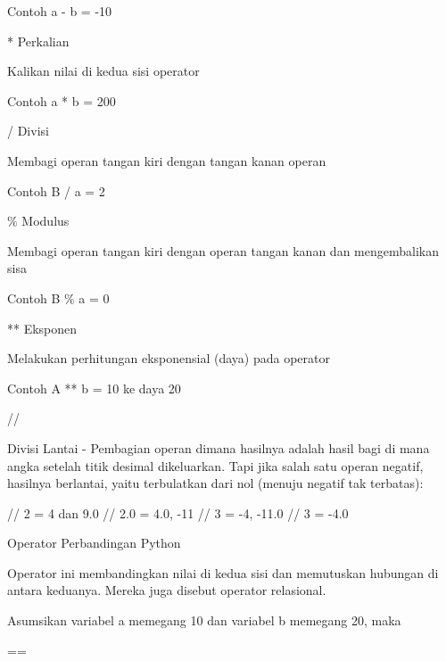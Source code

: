 \noindent 
Contoh a - b = -10 \par
\vspace{12pt}
\noindent 
* Perkalian \par
\noindent 
Kalikan nilai di kedua sisi operator \par
\noindent 
Contoh a * b = 200 \par
\vspace{12pt}
\noindent 
/ Divisi \par
\noindent 
Membagi operan tangan kiri dengan tangan kanan operan \par
\noindent 
Contoh B / a = 2 \par
\vspace{12pt}
\noindent 
 $  \%  $ Modulus \par
\noindent 
Membagi operan tangan kiri dengan operan tangan kanan dan mengembalikan sisa \par
\noindent 
Contoh B $  \%  $ a = 0 \par
\vspace{12pt}
\noindent 
** Eksponen \par
\noindent 
Melakukan perhitungan eksponensial (daya) pada operator \par
\noindent 
Contoh A ** b = 10 ke daya 20 \par
\vspace{12pt}
\noindent 
// \par
\vspace{12pt}
\noindent 
Divisi Lantai - Pembagian operan dimana hasilnya adalah hasil bagi di mana angka setelah titik desimal dikeluarkan. $  $Tapi jika salah satu operan negatif, hasilnya berlantai, yaitu terbulatkan dari nol (menuju negatif tak terbatas): \par
\vspace{12pt}
 // 2 = 4 dan 9.0 // 2.0 = 4.0, -11 // 3 = -4, -11.0 // 3 = -4.0 \par
\vspace{12pt}
\noindent 
Operator Perbandingan Python \par
\vspace{12pt}
\noindent 
Operator ini membandingkan nilai di kedua sisi dan memutuskan hubungan di antara keduanya. $  $Mereka juga disebut operator relasional. \par
\vspace{12pt}
\noindent 
Asumsikan variabel a memegang 10 dan variabel b memegang 20, maka  \par
\vspace{12pt}
\noindent 
== \par
